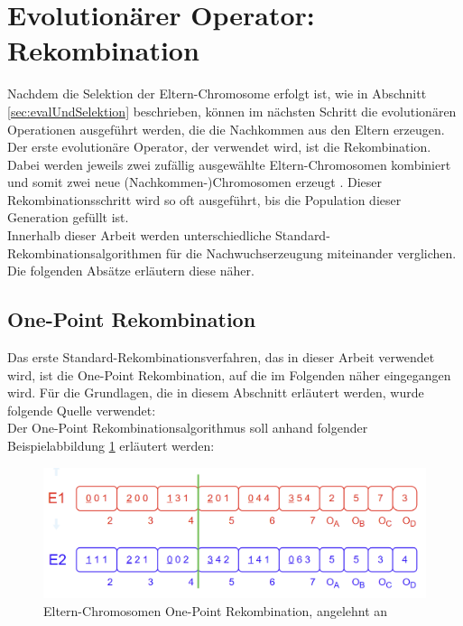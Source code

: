 \section{Evolutionärer Operator: Rekombination}
\label{sec:evolutionäreOperatoren}
Nachdem die Selektion der Eltern-Chromosome erfolgt ist, wie in Abschnitt \ref{sec:evalUndSelektion} beschrieben, können im nächsten Schritt die evolutionären Operationen ausgeführt werden, die die Nachkommen aus den Eltern erzeugen. \\
Der erste evolutionäre Operator, der verwendet wird, ist die Rekombination.
Dabei werden jeweils zwei zufällig ausgewählte Eltern-Chromosomen kombiniert und somit zwei neue (Nachkommen-)Chromosomen erzeugt \cite{kalkreuth_comprehensive_2020}. Dieser Rekombinationsschritt wird so oft ausgeführt, bis die Population dieser Generation gefüllt ist.\\
Innerhalb dieser Arbeit werden unterschiedliche Standard-Rekombinationsalgorithmen für die Nachwuchserzeugung miteinander verglichen.
Die folgenden Absätze erläutern diese näher.

\subsection{One-Point Rekombination}
\label{subsubsec:onePointCrossover}
Das erste Standard-Rekombinationsverfahren, das in dieser Arbeit verwendet wird, ist die One-Point Rekombination, auf die im Folgenden näher eingegangen wird.
Für die Grundlagen, die in diesem Abschnitt erläutert werden, wurde folgende Quelle verwendet: \cite{pavai_survey_2017}\\
Der One-Point Rekombinationsalgorithmus soll anhand folgender Beispielabbildung \ref{fig:onePointCrossoverEltern} erläutert werden:

\begin{figure}[H]
    \centering
    \includegraphics[scale = 0.45]{Bilder/BeispielOnePointCrossover.png}
    \caption{Eltern-Chromosomen One-Point Rekombination, angelehnt an \cite{torabi_using_2022}}
    \label{fig:onePointCrossoverEltern}
\end{figure}

